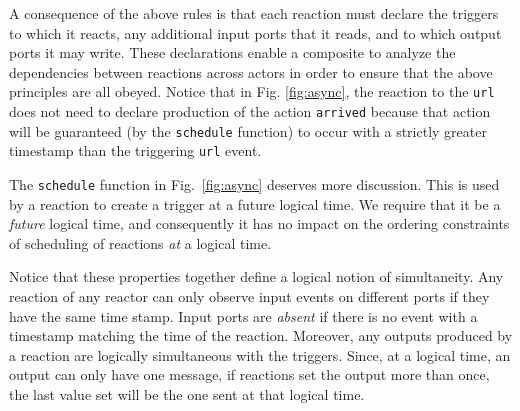 \documentclass[sigconf]{acmart}
\begin{document}
A consequence of the above rules is that each reaction must declare the triggers to which
it reacts, any additional input ports that it reads, and to which output ports it may write.
These declarations enable a composite to analyze the dependencies between reactions across actors
in order to ensure that the above principles are all obeyed.
Notice that in Fig. \ref{fig:async}, the reaction to the \texttt{url} does not need to declare production
of the action \texttt{arrived} because that action will be guaranteed (by the \texttt{schedule} function) to
occur with a strictly greater timestamp than the triggering \texttt{url} event.

The \texttt{schedule} function in Fig.~\ref{fig:async} deserves more discussion.
This is used by a reaction to create a trigger at a future logical time.
We require that it be a \emph{future} logical time, and consequently it has no impact on
the ordering constraints of scheduling of reactions \emph{at} a logical time.

Notice that these properties together define a logical notion of simultaneity.
Any reaction of any reactor can only observe input events on different ports if they have the same time stamp.
Input ports are \emph{absent} if there is no event with a timestamp matching the time of the reaction.
Moreover, any outputs produced by a reaction are logically simultaneous with the triggers.
Since, at a logical time, an output can only have one message, if reactions set the output more than once,
the last value set will be the one sent at that logical time.
\end{document}
